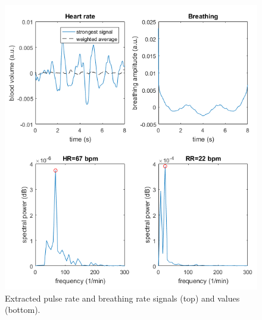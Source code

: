 \documentclass{article}
\begin{document}
\begin{figure}
\centering
\includegraphics[width=\textwidth]{Milestone2_Signals}
\caption{Extracted pulse rate and breathing rate signals (top) and values (bottom).}
\label{fig:signals}
\end{figure}
\end{document}

